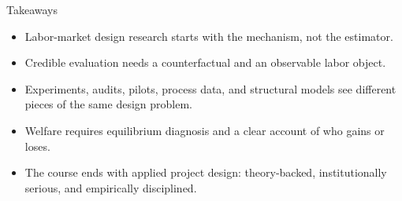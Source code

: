 \documentclass[aspectratio=169,11pt]{beamer}
\begin{document}
\begin{frame}{Takeaways}
\begin{itemize}
    \item Labor-market design research starts with the mechanism, not the estimator.
    \item Credible evaluation needs a counterfactual and an observable labor object.
    \item Experiments, audits, pilots, process data, and structural models see different pieces of the same design problem.
    \item Welfare requires equilibrium diagnosis and a clear account of who gains or loses.
    \item The course ends with applied project design: theory-backed, institutionally serious, and empirically disciplined.
\end{itemize}
\end{frame}
\end{document}
